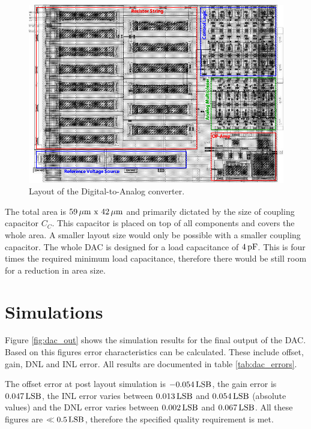 \documentclass[parskip,oneside,colorbacktitle,10pt,accentcolor=tud1b,table]{tudreport}
\begin{document}
{\begin{figure}[H]
	\begin{center}
		\includegraphics[width=\linewidth]{top_layout2_fin}
		 \caption{Layout of the Digital-to-Analog converter.}
		 \label{fig:dac_layout}
	\end{center}
\end{figure}

The total area is $\unit[59]{\mu m} \text{ x } \unit[42]{\mu m}$ and primarily dictated by the size of coupling capacitor $C_C$. This capacitor is placed on top of all components and covers the whole area. A smaller layout size would only be possible with a smaller coupling capacitor. The whole DAC is designed for a load capacitance of $\unit[4]{pF}$. This is four times the required minimum load capacitance, therefore there would be still room for a reduction in area size.

\section{Simulations}

Figure \ref{fig:dac_out} shows the simulation results for the final output of the DAC. Based on this figures error characteristics can be calculated. These include offset, gain, DNL and INL error. All results are documented in table \ref{tab:dac_errors}.

The offset error at post layout simulation is $\unit[-0.054]{LSB}$, the gain error is $\unit[0.047]{LSB}$, the INL error varies between $\unit[0.013]{LSB}$ and $\unit[0.054]{LSB}$ (absolute values) and the DNL error varies between $\unit[0.002]{LSB}$ and $\unit[0.067]{LSB}$. All these figures are $\ll \unit[0.5]{LSB}$, therefore the specified quality requirement is met.

}
\end{document}
